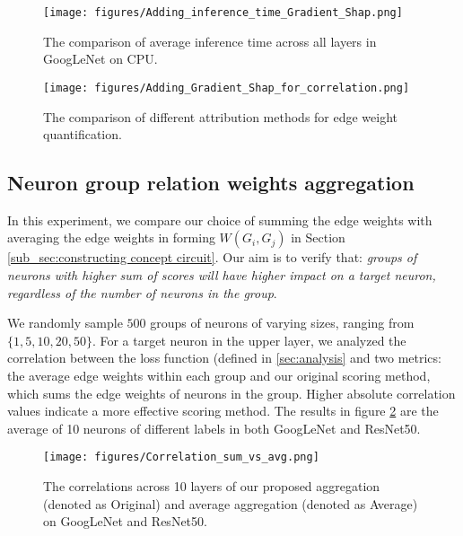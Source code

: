 \begin{figure}[tbh]
    \centering
    \begin{minipage}{.4\textwidth}
        \texttt{[image: figures/Adding\_inference\_time\_Gradient\_Shap.png]}
        \vspace{-3mm}
        \caption{{The comparison of average inference time across all layers in GoogLeNet on CPU.}}\label{fig:run time}   
    \end{minipage}
    \hfill
    \begin{minipage}{.57\textwidth}
        \vspace{-2.5mm}
        \texttt{[image: figures/Adding\_Gradient\_Shap\_for\_correlation.png]} 
        \vspace{-5mm}
        \caption{{The comparison of different attribution methods for edge weight quantification.}}\label{fig:compare_scoring}
    \end{minipage}
\end{figure}

\subsection{{Neuron group relation weights aggregation}}
\label{sec:weight_aggregation}
{In this experiment, we compare our choice of summing the edge weights with averaging the edge weights in forming $W(G_i, G_j)$ in Section \ref{sub_sec:constructing concept circuit}. Our aim is to verify that: \textit{groups of neurons with higher sum of scores will have higher impact on a target neuron, regardless of the number of neurons in the group}.}

{We randomly sample $500$ groups of neurons of varying sizes, ranging from $\{1, 5, 10, 20, 50\}$. For a target neuron in the upper layer, we analyzed the correlation between the loss function (defined in \ref{sec:analysis} and two metrics: the average edge weights within each group and our original scoring method, which sums the edge weights of neurons in the group. Higher absolute correlation values indicate a more effective scoring method. The results in figure \ref{fig:sum_vs_avg} are the average of 10 neurons of different labels in both GoogLeNet and ResNet50.}

\begin{figure}[tbh] 
\vspace{-3mm}
\begin{center}
\texttt{[image: figures/Correlation\_sum\_vs\_avg.png]} 
\end{center}
\vspace{-3mm}
\caption{{The correlations across 10 layers of our proposed aggregation (denoted as Original) and average aggregation (denoted as Average) on GoogLeNet and ResNet50.}}\label{fig:sum_vs_avg}
\end{figure}

